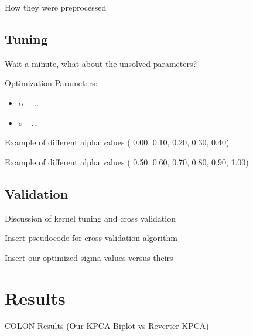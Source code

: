 \documentclass[serif]{beamer}
\begin{document}
	\begin{frame}
		How they were preprocessed
	\end{frame}

	\subsection{Tuning}
	\begin{frame}
		Wait a minute, what about the unsolved parameters?
	\end{frame}
	
	\begin{frame}
		\begin{block}{Optimization Parameters:}
			\begin{itemize}
				\item  $\alpha$ - ...
				\item  $\sigma$ - ...
			\end{itemize}
		\end{block}	
	\end{frame}
	
	\begin{frame}
		Example of different alpha values ( 0.00, 0.10, 0.20, 0.30, 0.40)
	\end{frame}
	
	\begin{frame}
		Example of different alpha values ( 0.50, 0.60, 0.70, 0.80, 0.90, 1.00)
	\end{frame}
	
	\subsection{Validation}
	\begin{frame}
		Discussion of kernel tuning and cross validation 
	\end{frame}
	
	\begin{frame}
		Insert pseudocode for cross validation algorithm
	\end{frame}
	
	\begin{frame}
		Insert our optimized sigma values versus theirs
	\end{frame}
	
	
	\section{Results}
	
	\begin{frame}
		COLON Results (Our KPCA-Biplot vs Reverter KPCA)
	\end{frame}
	
\end{document}
